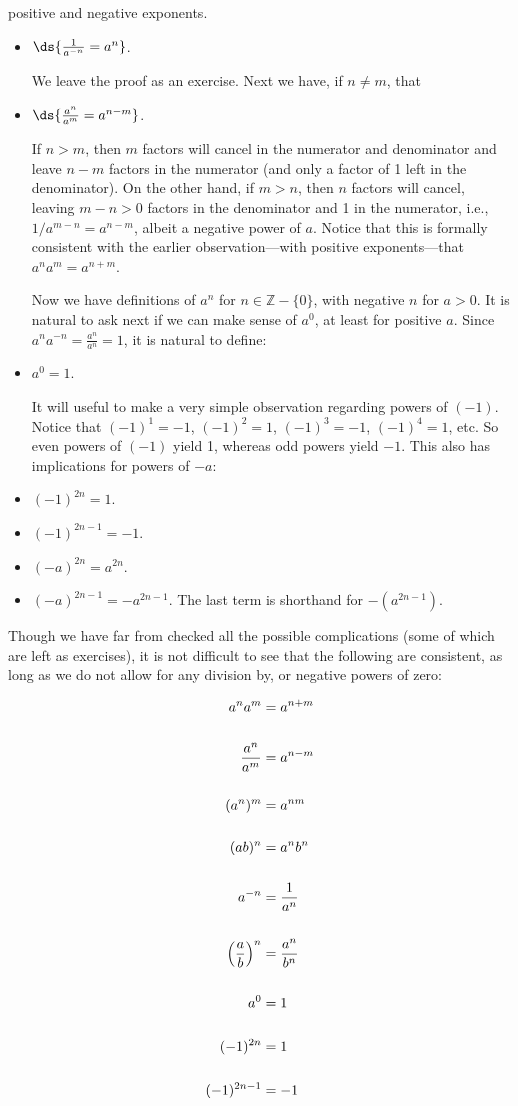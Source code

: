positive and negative exponents.
\begin{itemize}
\item $\ds{\frac1{a^{-n}}=a^n}$.

We leave the proof as an exercise.  Next we have, if $n\ne m$,
that
\item $\ds{\frac{a^n}{a^m}=a^{n-m}}$.

If $n>m$, then $m$ factors will cancel in the numerator
and denominator and leave $n-m$ factors in the numerator
(and only a factor of 1 left in the denominator).
On the other hand, if $m>n$, then $n$ factors will
cancel, leaving $m-n>0$ factors in the denominator
and 1 in the numerator, i.e., $1/a^{m-n}=a^{n-m}$,
albeit a negative power of $a$.  Notice that this is 
formally consistent with the earlier observation---with
positive exponents---that $a^na^m=a^{n+m}$.

Now we have definitions of $a^n$ for $n\in\mathbb{Z}-\{0\}$,
with negative $n$ for $a>0$.  It is natural to ask next
if we can make sense of $a^0$, at least for 
positive $a$.  
Since $a^na^{-n}=\frac{a^n}{a^n}=1$, it is natural
to define:
\item $a^0=1$.

It will useful to make a very simple observation
regarding powers of $(-1)$.  Notice that
$(-1)^1=-1$, $(-1)^2=1$, $(-1)^3=-1$, 
$(-1)^4=1$, etc.  So even powers of $(-1)$
yield 1, whereas odd powers yield $-1$.  This
also has implications for powers of $-a$:
\item $(-1)^{2n}=1$.
\item $(-1)^{2n-1}=-1$.
\item $(-a)^{2n}=a^{2n}$.
\item $(-a)^{2n-1}=-a^{2n-1}.$
The last term is shorthand for $-(a^{2n-1})$.
\end{itemize}
Though we have far from checked all the possible complications
(some of which are left as exercises), it is not difficult
to see that the following are consistent, as long as 
we do not allow for any division by, or negative powers
of zero:


\begin{align}
a^{n}a^m&=a^{n+m}\\ \notag\\
\frac{a^n}{a^m}&=a^{n-m}\\ \notag \\
(a^n)^m&=a^{nm}\\ \notag\\
(ab)^n&=a^nb^n\\ \notag\\
a^{-n}&=\frac{1}{a^n}\\ \notag\\
\left(\frac{a}b\right)^n&=\frac{a^n}{b^n}\\ \notag\\
a^0&=1\\
\notag\\ (-1)^{2n}&=1\\ \notag \\
(-1)^{2n-1}&=-1
\end{align}

